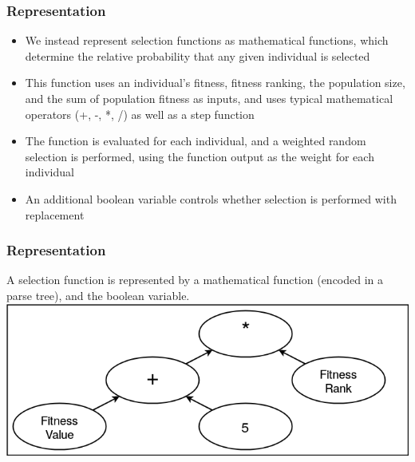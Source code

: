 \documentclass{beamer}
\begin{document}
	
	\begin{frame}
		\frametitle{Representation}
		
		\begin{itemize}
			 \item<1-|alert@1> We instead represent selection functions as mathematical functions, which determine the relative probability that any given individual is selected
			 \item<2-|alert@2> This function uses an individual's fitness, fitness ranking, the population size, and the sum of population fitness as inputs, and uses typical mathematical operators (+, -, *, /) as well as a step function
			 \item<3-|alert@3> The function is evaluated for each individual, and a weighted random selection is performed, using the function output as the weight for each individual
			 \item<4-|alert@4> An additional boolean variable controls whether selection is performed with replacement
			 
		
		\end{itemize}
	\end{frame}
	
	\begin{frame}
		\frametitle{Representation}
		A selection function is represented by a mathematical function (encoded in a parse tree), and the boolean variable.
		\includegraphics[width=\textwidth]{example_adpsea_no_replacement_bit}
	\end{frame}
	
\end{document}
